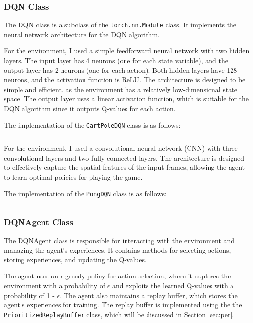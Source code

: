 \subsubsection{DQN Class}

The DQN class is a subclass of the \href{https://pytorch.org/docs/stable/generated/torch.nn.Module.html#torch.nn.Module}{\texttt{torch.nn.Module}} class. It implements the neural network architecture for the DQN algorithm.

For the \cartpole environment, I used a simple feedforward neural network with two hidden layers. The input layer has 4 neurons (one for each state variable), and the output layer has 2 neurons (one for each action).
Both hidden layers have 128 neurons, and the activation function is ReLU.
The architecture is designed to be simple and efficient, as the \cartpole environment has a relatively low-dimensional state space.
The output layer uses a linear activation function, which is suitable for the DQN algorithm since it outputs Q-values for each action.

The implementation of the \texttt{CartPoleDQN} class is as follows:
\inputminted[firstline=5,lastline=17]{python}{../models.py}

For the \pong environment, I used a convolutional neural network (CNN) with three convolutional layers and two fully connected layers. The architecture is designed to effectively capture the spatial features of the input frames, allowing the agent to learn optimal policies for playing the game.

The implementation of the \texttt{PongDQN} class is as follows:
\inputminted[firstline=20]{python}{../models.py}

\subsubsection{DQNAgent Class}

The DQNAgent class is responsible for interacting with the environment and managing the agent's experiences.
It contains methods for selecting actions, storing experiences, and updating the Q-values.

The agent uses an $\epsilon$-greedy policy for action selection, where it explores the environment with a probability of $\epsilon$ and exploits the learned Q-values with a probability of 1 - $\epsilon$.
The agent also maintains a replay buffer, which stores the agent's experiences for training.
The replay buffer is implemented using the the \texttt{PrioritizedReplayBuffer} class, which will be discussed in Section \ref{sec:per}.

